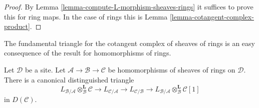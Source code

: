 \begin{proof}
By Lemma \ref{lemma-compute-L-morphism-sheaves-rings}
it suffices to prove this for ring maps.
In the case of rings this is
Lemma \ref{lemma-cotangent-complex-product}.
\end{proof}

\noindent
The fundamental triangle for the cotangent complex of sheaves of rings
is an easy consequence of the result for homomorphisms of rings.

\begin{lemma}
\label{lemma-triangle-sheaves-rings}
Let $\mathcal{D}$ be a site. Let $\mathcal{A} \to \mathcal{B} \to \mathcal{C}$
be homomorphisms of sheaves of rings on $\mathcal{D}$.
There is a canonical distinguished triangle
$$
L_{\mathcal{B}/\mathcal{A}} \otimes_\mathcal{B}^\mathbf{L} \mathcal{C}
\to L_{\mathcal{C}/\mathcal{A}} \to L_{\mathcal{C}/\mathcal{B}} \to
L_{\mathcal{B}/\mathcal{A}} \otimes_\mathcal{B}^\mathbf{L} \mathcal{C}[1]
$$
in $D(\mathcal{C})$.
\end{lemma}

